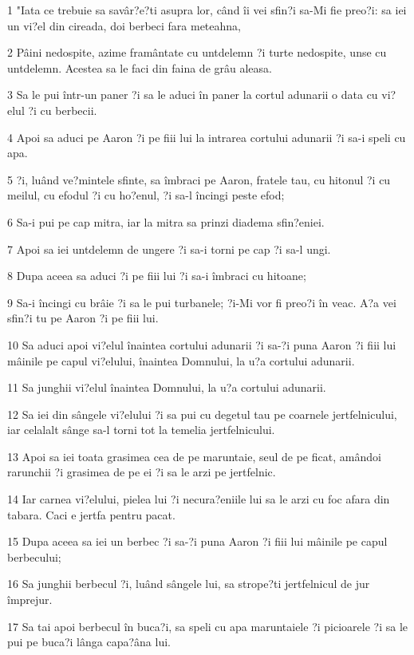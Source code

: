 \par 1 "Iata ce trebuie sa savâr?e?ti asupra lor, când îi vei sfin?i sa-Mi fie preo?i: sa iei un vi?el din cireada, doi berbeci fara meteahna,
\par 2 Pâini nedospite, azime framântate cu untdelemn ?i turte nedospite, unse cu untdelemn. Acestea sa le faci din faina de grâu aleasa.
\par 3 Sa le pui într-un paner ?i sa le aduci în paner la cortul adunarii o data cu vi?elul ?i cu berbecii.
\par 4 Apoi sa aduci pe Aaron ?i pe fiii lui la intrarea cortului adunarii ?i sa-i speli cu apa.
\par 5 ?i, luând ve?mintele sfinte, sa îmbraci pe Aaron, fratele tau, cu hitonul ?i cu meilul, cu efodul ?i cu ho?enul, ?i sa-l încingi peste efod;
\par 6 Sa-i pui pe cap mitra, iar la mitra sa prinzi diadema sfin?eniei.
\par 7 Apoi sa iei untdelemn de ungere ?i sa-i torni pe cap ?i sa-l ungi.
\par 8 Dupa aceea sa aduci ?i pe fiii lui ?i sa-i îmbraci cu hitoane;
\par 9 Sa-i încingi cu brâie ?i sa le pui turbanele; ?i-Mi vor fi preo?i în veac. A?a vei sfin?i tu pe Aaron ?i pe fiii lui.
\par 10 Sa aduci apoi vi?elul înaintea cortului adunarii ?i sa-?i puna Aaron ?i fiii lui mâinile pe capul vi?elului, înaintea Domnului, la u?a cortului adunarii.
\par 11 Sa junghii vi?elul înaintea Domnului, la u?a cortului adunarii.
\par 12 Sa iei din sângele vi?elului ?i sa pui cu degetul tau pe coarnele jertfelnicului, iar celalalt sânge sa-l torni tot la temelia jertfelnicului.
\par 13 Apoi sa iei toata grasimea cea de pe maruntaie, seul de pe ficat, amândoi rarunchii ?i grasimea de pe ei ?i sa le arzi pe jertfelnic.
\par 14 Iar carnea vi?elului, pielea lui ?i necura?eniile lui sa le arzi cu foc afara din tabara. Caci e jertfa pentru pacat.
\par 15 Dupa aceea sa iei un berbec ?i sa-?i puna Aaron ?i fiii lui mâinile pe capul berbecului;
\par 16 Sa junghii berbecul ?i, luând sângele lui, sa strope?ti jertfelnicul de jur împrejur.
\par 17 Sa tai apoi berbecul în buca?i, sa speli cu apa maruntaiele ?i picioarele ?i sa le pui pe buca?i lânga capa?âna lui.
